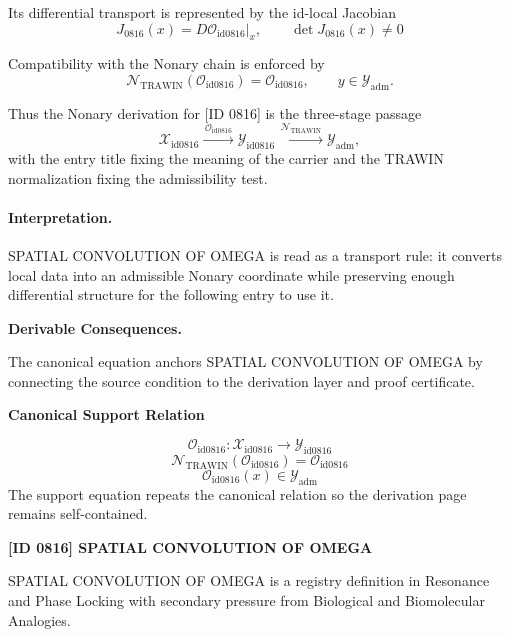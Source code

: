 Its differential transport is represented by the id-local Jacobian\[
J_{0816}(x)=D\mathcal{O}_{\mathrm{id0816}}\big|_x,\qquad \det J_{0816}(x)\neq 0
\]

Compatibility with the Nonary chain is enforced by\[
\mathcal{N}_{\mathrm{TRAWIN}}(\mathcal{O}_{\mathrm{id0816}})=\mathcal{O}_{\mathrm{id0816}},\qquad y\in\mathcal{Y}_{\mathrm{adm}}.
\]

Thus the Nonary derivation for [ID 0816] is the three-stage passage
\[
\mathcal{X}_{\mathrm{id0816}}\xrightarrow{\,\mathcal{O}_{\mathrm{id0816}}\,} \mathcal{Y}_{\mathrm{id0816}}\xrightarrow{\,\mathcal{N}_{\mathrm{TRAWIN}}\,} \mathcal{Y}_{\mathrm{adm}},
\]
with the entry title fixing the meaning of the carrier and the TRAWIN normalization fixing the admissibility test.

\paragraph{Interpretation.} SPATIAL CONVOLUTION OF OMEGA is read as a transport rule: it converts local data into an admissible Nonary coordinate while preserving enough differential structure for the following entry to use it.

\par\vspace{0.35em}
\noindent\textbf{Derivable Consequences.}\quad
\begingroup
\footnotesize
\raggedright
The canonical equation anchors SPATIAL CONVOLUTION OF OMEGA by connecting the source condition to the derivation layer and proof certificate.
\par\endgroup

\noindent\textbf{Canonical Support Relation}\par
\[
\mathcal{O}_{\mathrm{id0816}}:\mathcal{X}_{\mathrm{id0816}}\longrightarrow\mathcal{Y}_{\mathrm{id0816}}
\]
\[
\mathcal{N}_{\mathrm{TRAWIN}}(\mathcal{O}_{\mathrm{id0816}})=\mathcal{O}_{\mathrm{id0816}}
\]
\[
\mathcal{O}_{\mathrm{id0816}}(x)\in\mathcal{Y}_{\mathrm{adm}}
\]
\noindent The support equation repeats the canonical relation so the derivation page remains self-contained.\par

\clearpage
\noindent\textbf{[ID 0816] SPATIAL CONVOLUTION OF OMEGA}\par
\vspace{0.35em}
\begingroup\small
{}
SPATIAL CONVOLUTION OF OMEGA is a registry definition in Resonance and Phase Locking with secondary pressure from Biological and Biomolecular Analogies.

